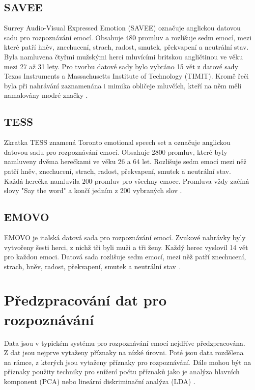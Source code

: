 \documentclass[FM,BP]{tulthesis}
\begin{document}
\subsection{SAVEE} %
Surrey Audio-Visual Expressed Emotion (SAVEE) označuje anglickou datovou sadu pro rozpoznávání emocí. Obsahuje 480 promluv a rozlišuje sedm emocí, mezi které patří hněv, znechucení, strach, radost, smutek, překvapení a neutrální stav. Byla namluvena čtyřmi mužskými herci mluvícími britskou angličtinou ve věku mezi 27 až 31 lety. Pro tvorbu datové sady bylo vybráno 15 vět z datové sady Texas Instruments a Massachusetts Institute of Technology (TIMIT). Kromě řeči byla při nahrávání zaznamenána i mimika obličeje mluvčích, kteří na něm měli namalovány modré značky \cite{savee}.

\subsection{TESS} %
Zkratka TESS \cite{SP2/E8H2MF_2020} znamená Toronto emotional speech set a označuje anglickou datovou sadu pro rozpoznávání emocí. Obsahuje 2800 promluv, které byly namluveny dvěma herečkami ve věku 26 a 64 let. Rozlišuje sedm emocí mezi něž patří hněv, znechucení, strach, radost, překvapení, smutek a neutrální stav. Každá herečka namluvila 200 promluv pro všechny emoce. Promluva vždy začíná slovy "Say the word" a končí jedním z 200 vybraných slov \cite{tess}.

\subsection{EMOVO} %
EMOVO \cite{DBLP:conf/lrec/CostantiniIPT14} je italská datová sada pro rozpoznávání emocí. Zvukové nahrávky byly vytvořeny šesti herci, z nichž tři byli muži a tři ženy. Každý herec vyslovil 14 vět pro každou emoci. Datová sada rozlišuje sedm emocí, mezi něž patří znechucení, strach, hněv, radost, překvapení, smutek a neutrální stav \cite{DBLP:conf/lrec/CostantiniIPT14}.

\section{Předzpracování dat pro rozpoznávání} %
Data jsou v typickém systému pro rozpoznávání emocí nejdříve předzpracována. Z dat jsou nejprve vytaženy příznaky na nízké úrovni. Poté jsou data rozdělena na rámce, z kterých jsou vytaženy příznaky pro rozpoznávání. Dále mohou být na příznaky použity techniky pro snížení počtu příznaků jako je analýza hlavních komponent (PCA) nebo lineární diskriminační analýza (LDA) \cite{konar_chakraborty_2015}.
\end{document}
